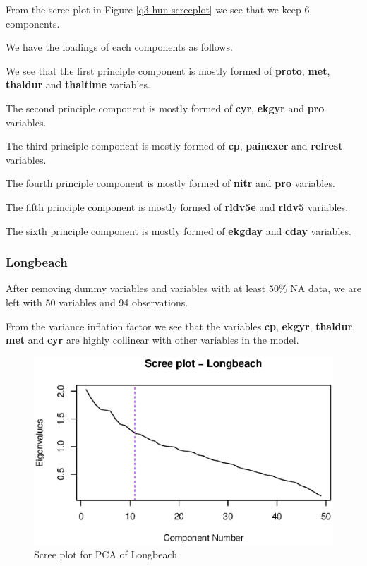 \documentclass[a4paper]{article}
\begin{document}
From the scree plot in Figure \ref{q3-hun-screeplot} we see that we keep 6
components.

We have the loadings of each components as follows.



We see that the first principle component is mostly formed of \textbf{proto},
\textbf{met}, \textbf{thaldur} and \textbf{thaltime} variables.

The second principle component is mostly formed of \textbf{cyr}, \textbf{ekgyr}
and \textbf{pro} variables.

The third principle component is mostly formed of \textbf{cp}, \textbf{painexer}
and \textbf{relrest} variables.

The fourth principle component is mostly formed of \textbf{nitr} and
\textbf{pro} variables.

The fifth principle component is mostly formed of \textbf{rldv5e} and
\textbf{rldv5} variables.

The sixth principle component is mostly formed of \textbf{ekgday} and
\textbf{cday} variables.

\subsubsection{Longbeach}

After removing dummy variables and variables with at least $50\%$ NA data, we
are left with 50 variables and 94 observations.



From the variance inflation factor we see that the variables \textbf{cp},
\textbf{ekgyr}, \textbf{thaldur}, \textbf{met} and \textbf{cyr} are highly
collinear with other variables in the model.

\begin{figure}[H]
	\begin{center}
		\includegraphics[width=12cm]{question3output/lonscreeplot.eps}
	\end{center}
	\caption{Scree plot for PCA of Longbeach}
	\label{q3-lon-screeplot}
\end{figure}
\end{document}
